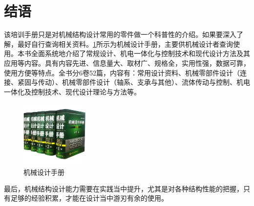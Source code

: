 \documentclass[UTF8]{article} %
\begin{document}
\section{结语}
该培训手册只是对机械结构设计常用的零件做一个科普性的介绍。如果要深入了解，最好自行查询相关资料。\ref{jxs}所示为机械设计手册，主要供机械设计者查询使用。本书全面系统地介绍了常规设计、机电一体化与控制技术和现代设计方法及其应用等内容。具有内容先进、信息量大、取材广、规格全，实用性强，数据可靠，使用方便等特点。全书分6卷52篇，内容有：常用设计资料、机械零部件设计（连接、紧固与传动）、机械零部件设计（轴系、支承与其他）、流体传动与控制、机电一体化及控制技术、现代设计理论与方法等\cite{bai}。

\begin{figure}[h]
  \centering
  \includegraphics[width=0.3\textwidth]{jx.png}
  \caption{机械设计手册}
  \label{jxs}
\end{figure}

最后，机械结构设计能力需要在实践当中提升，尤其是对各种结构性能的把握，只有足够的经验积累，才能在设计当中游刃有余的使用。


 
\end{document}
